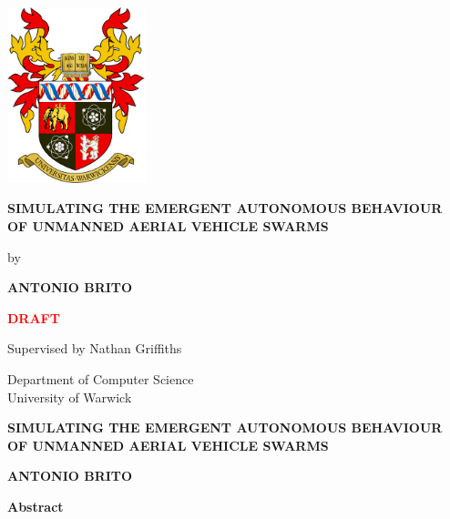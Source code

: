 \documentclass[12pt]{article}
\begin{document}
\begin{titlepage}
    \centering
    \vspace*{1cm}

    
    
    \includegraphics[width=0.3\textwidth]{crest}

    \vspace{1.5cm}
    \Large
    \textbf{SIMULATING THE EMERGENT AUTONOMOUS BEHAVIOUR OF UNMANNED AERIAL VEHICLE SWARMS}

    \vspace{1cm}

    by

    \vspace{1cm}
    
    \textbf{ANTONIO BRITO}
    
    \vfill
    \Huge
    \textcolor{red}{\textbf{DRAFT}}

    \vfill
    \Large
    Supervised by Nathan Griffiths
    
    
    \vspace{1.5cm}
    
    \Large
    Department of Computer Science\\
    University of Warwick\\
    \the\year
    
\end{titlepage}
\tableofcontents
\newpage

\begin{center}
    \vspace{0.8cm}
    \Large
    \textbf{SIMULATING THE EMERGENT AUTONOMOUS BEHAVIOUR OF UNMANNED AERIAL VEHICLE SWARMS}

    \large
    \vspace{0.8cm}
    \textbf{ANTONIO BRITO}

    \vfill
       
    \Large
    \textbf{Abstract}
    \vspace{2cm}
\end{center}
\onehalfspacing
\end{document}
